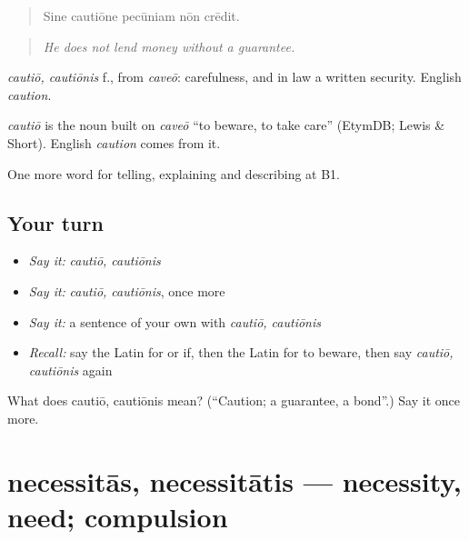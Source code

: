 \begin{quote}
Sine cautiōne pecūniam nōn crēdit.
\end{quote}

\begin{quote}
\emph{He does not lend money without a guarantee.}
\end{quote}

\emph{cautiō, cautiōnis} f., from \emph{caveō}: carefulness, and in law a written security. English \emph{caution}.

\begin{cousinweb}
\emph{cautiō} is the noun built on \emph{caveō} \textquotedblleft{}to beware, to take care\textquotedblright{} (EtymDB; Lewis \& Short). English \emph{caution} comes from it.
\end{cousinweb}

\begin{grammarlens}[title={What you've built}]
One more word for telling, explaining and describing at B1.
\end{grammarlens}

\subsection*{Your turn}
\begin{itemize}
\raggedright
  \item \emph{Say it:} \emph{cautiō, cautiōnis}
  \item \emph{Say it:} \emph{cautiō, cautiōnis}, once more
  \item \emph{Say it:} a sentence of your own with \emph{cautiō, cautiōnis}
  \item \emph{Recall:} say the Latin for or if, then the Latin for to beware, then say \emph{cautiō, cautiōnis} again
\end{itemize}

\begin{tcolorbox}[breakable,colback=teal!4,colframe=teal!35!black,title={Before you move on}]
What does cautiō, cautiōnis mean? (\textquotedblleft{}Caution; a guarantee, a bond\textquotedblright{}.) Say it once more.
\end{tcolorbox}
\section[necessitās, necessitātis]{necessitās, necessitātis — necessity, need; compulsion}

\label{lesson:LA-C392-necessitas}



